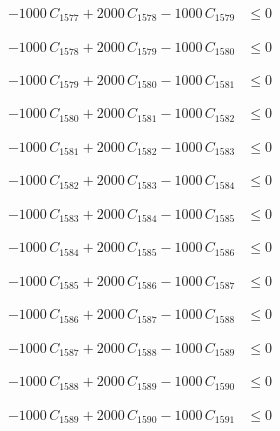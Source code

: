 \documentclass[a4paper,11pt]{article}
\begin{document}
\begin{align}
-1000\,C_{1577} + 2000\,C_{1578} - 1000\,C_{1579} &\leq 0 \nonumber
\end{align}

\begin{align}
-1000\,C_{1578} + 2000\,C_{1579} - 1000\,C_{1580} &\leq 0 \nonumber
\end{align}

\begin{align}
-1000\,C_{1579} + 2000\,C_{1580} - 1000\,C_{1581} &\leq 0 \nonumber
\end{align}

\begin{align}
-1000\,C_{1580} + 2000\,C_{1581} - 1000\,C_{1582} &\leq 0 \nonumber
\end{align}

\begin{align}
-1000\,C_{1581} + 2000\,C_{1582} - 1000\,C_{1583} &\leq 0 \nonumber
\end{align}

\begin{align}
-1000\,C_{1582} + 2000\,C_{1583} - 1000\,C_{1584} &\leq 0 \nonumber
\end{align}

\begin{align}
-1000\,C_{1583} + 2000\,C_{1584} - 1000\,C_{1585} &\leq 0 \nonumber
\end{align}

\begin{align}
-1000\,C_{1584} + 2000\,C_{1585} - 1000\,C_{1586} &\leq 0 \nonumber
\end{align}

\begin{align}
-1000\,C_{1585} + 2000\,C_{1586} - 1000\,C_{1587} &\leq 0 \nonumber
\end{align}

\begin{align}
-1000\,C_{1586} + 2000\,C_{1587} - 1000\,C_{1588} &\leq 0 \nonumber
\end{align}

\begin{align}
-1000\,C_{1587} + 2000\,C_{1588} - 1000\,C_{1589} &\leq 0 \nonumber
\end{align}

\begin{align}
-1000\,C_{1588} + 2000\,C_{1589} - 1000\,C_{1590} &\leq 0 \nonumber
\end{align}

\begin{align}
-1000\,C_{1589} + 2000\,C_{1590} - 1000\,C_{1591} &\leq 0 \nonumber
\end{align}
\end{document}
